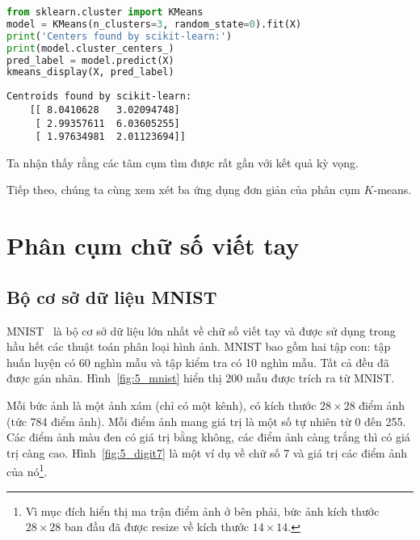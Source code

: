 \begin{lstlisting}[language=Python]
from sklearn.cluster import KMeans
model = KMeans(n_clusters=3, random_state=0).fit(X)
print('Centers found by scikit-learn:')
print(model.cluster_centers_)
pred_label = model.predict(X)
kmeans_display(X, pred_label)
\end{lstlisting}
\kq 
\begin{lstlisting}
Centroids found by scikit-learn:
    [[ 8.0410628   3.02094748]
     [ 2.99357611  6.03605255]
     [ 1.97634981  2.01123694]]
\end{lstlisting}
Ta nhận thấy rằng các tâm cụm tìm được rất gần với kết quả kỳ vọng. 

Tiếp theo, chúng ta cùng xem xét ba ứng dụng đơn giản của phân cụm $K$-means. 






\section{Phân cụm chữ số viết tay }

\subsection{Bộ cơ sở dữ liệu MNIST }

MNIST~\cite{lecun2010mnist} là bộ cơ sở dữ liệu lớn nhất về chữ số viết tay và
được sử dụng trong hầu hết các thuật toán phân loại hình ảnh. MNIST bao gồm hai
tập con: tập huấn luyện có 60 nghìn mẫu và tập kiểm tra có 10 nghìn mẫu. Tất cả
đều đã được gán nhãn. Hình~\ref{fig:5_mnist} hiển thị 200 mẫu được trích ra từ
MNIST.




Mỗi bức ảnh là một ảnh xám (chỉ có một kênh), có kích thước $28\times28$
điểm ảnh (tức 784 điểm ảnh). Mỗi điểm ảnh mang giá trị là một số tự nhiên từ 0
đến 255. Các điểm ảnh màu đen có giá trị bằng không, các điểm ảnh càng trắng thì có giá trị càng cao. Hình~\ref{fig:5_digit7} là một ví dụ về chữ
số 7 và giá trị các điểm ảnh của nó\footnote{Vì mục đích hiển thị ma trận điểm ảnh ở
bên phải, bức ảnh kích thước $28 \times 28$ ban đầu đã được resize về kích thước
$14 \times 14$.}.

